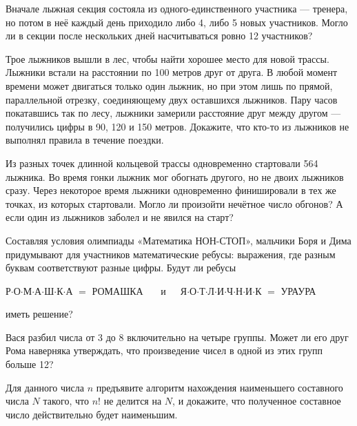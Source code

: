 \begin{itemize}
\itA Вначале лыжная секция состояла из одного-единственного участника — тренера, но потом в неё каждый день приходило либо 4, либо 5 новых участников. Могло ли в секции после нескольких дней насчитываться ровно 12 участников?

\itB Трое лыжников вышли в лес, чтобы найти хорошее место для новой трассы. Лыжники встали на расстоянии по 100 метров друг от друга. В любой момент времени может двигаться только один лыжник, но при этом лишь по прямой, параллельной отрезку, соединяющему двух оставшихся лыжников. Пару часов покатавшись так по лесу, лыжники замерили расстояние друг между другом — получились цифры в 90, 120 и 150 метров. Докажите, что кто-то из лыжников не выполнял правила в течение поездки.

\itC Из разных точек длинной кольцевой трассы одновременно стартовали 564 лыжника. Во время гонки лыжник мог обогнать другого, но не двоих лыжников сразу. Через некоторое время лыжники одновременно финишировали в тех же точках, из которых стартовали. Могло ли произойти нечётное число обгонов? А если один из лыжников заболел и не явился на старт?
\end{itemize}

\begin{itemize}
\itA Составляя условия олимпиады «Математика НОН-СТОП», мальчики Боря и Дима придумывают для участников математические ребусы: выражения, где разным буквам соответствуют разные цифры. Будут ли ребусы \smallskip \\
\centerline{Р$\cdot$О$\cdot$М$\cdot$А$\cdot$Ш$\cdot$К$\cdot$А $=$ РОМАШКА
\ \ \ и\ \ \ 
Я$\cdot$О$\cdot$Т$\cdot$Л$\cdot$И$\cdot$Ч$\cdot$Н$\cdot$И$\cdot$К $=$ УРАУРА} \smallskip
иметь решение?

\itB Вася разбил числа от 3 до 8 включительно на четыре группы. Может ли его друг Рома наверняка утверждать, что произведение чисел в одной из этих групп больше 12?

\itC Для данного числа $n$ предъявите алгоритм нахождения наименьшего составного числа $N$ такого, что $n!$ не делится на $N$, и докажите, что полученное составное число действительно будет наименьшим.
\end{itemize}


